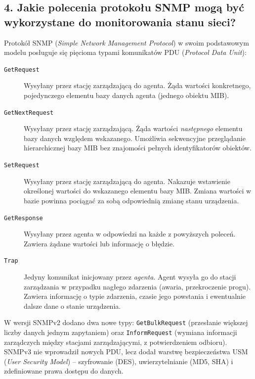 \documentclass[12pt,a4paper]{article}
\begin{document}
\subsection*{4. Jakie polecenia protokołu SNMP mogą być wykorzystane do
monitorowania stanu sieci?}

Protokół SNMP (\emph{Simple Network Management Protocol}) w swoim podstawowym
modelu posługuje się pięcioma typami komunikatów PDU
(\emph{Protocol Data Unit}):

\begin{description}
  \item[\texttt{GetRequest}]
        Wysyłany przez stację zarządzającą do agenta. Żąda wartości konkretnego,
        pojedynczego elementu bazy danych agenta (jednego obiektu MIB).
  \item[\texttt{GetNextRequest}]
        Wysyłany przez stację zarządzającą. Żąda wartości \emph{następnego}
        elementu bazy danych względem wskazanego. Umożliwia sekwencyjne
        przeglądanie hierarchicznej bazy MIB bez znajomości pełnych identyfikatorów
        obiektów.
  \item[\texttt{SetRequest}]
        Wysyłany przez stację zarządzającą do agenta. Nakazuje wstawienie
        określonej wartości do wskazanego elementu bazy MIB. Zmiana wartości
        w bazie powinna pociągać za sobą odpowiednią zmianę stanu urządzenia.
  \item[\texttt{GetResponse}]
        Wysyłany przez agenta w odpowiedzi na każde z powyższych poleceń.
        Zawiera żądane wartości lub informację o błędzie.
  \item[\texttt{Trap}]
        Jedyny komunikat inicjowany przez \emph{agenta}. Agent wysyła go
        do stacji zarządzania w przypadku nagłego zdarzenia (awaria, przekroczenie
        progu). Zawiera informację o typie zdarzenia, czasie jego powstania
        i ewentualnie dalsze dane o stanie urządzenia.
\end{description}

W wersji SNMPv2 dodano dwa nowe typy: \texttt{GetBulkRequest} (przesłanie
większej liczby danych jednym zapytaniem) oraz \texttt{InformRequest} (wymiana
informacji zarządczych między stacjami zarządzającymi, z potwierdzeniem
odbioru). SNMPv3 nie wprowadził nowych PDU, lecz dodał warstwę
bezpieczeństwa USM (\emph{User Security Model}) -- szyfrowanie (DES),
uwierzytelnianie (MD5, SHA) i zdefiniowane prawa dostępu do danych.

\end{document}
